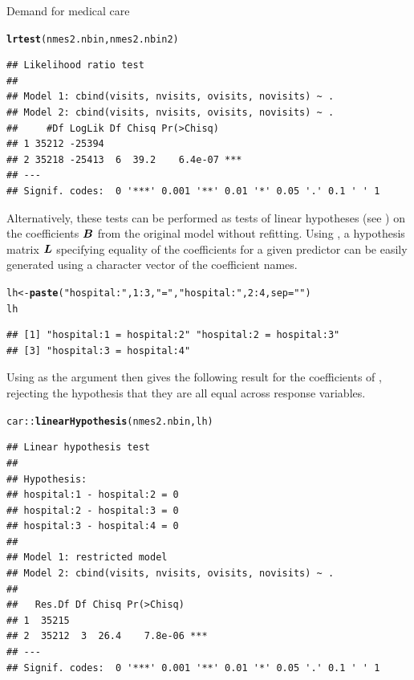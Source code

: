 \documentclass[11pt]{book}\usepackage[]{graphicx}\usepackage[]{color}
\makeatletter
\newcommand{\hlnum}[1]{\textcolor[rgb]{0.686,0.059,0.569}{#1}}%
\newcommand{\hlstr}[1]{\textcolor[rgb]{0.192,0.494,0.8}{#1}}%
\newcommand{\hlopt}[1]{\textcolor[rgb]{0,0,0}{#1}}%
\newcommand{\hlstd}[1]{\textcolor[rgb]{0.345,0.345,0.345}{#1}}%
\newcommand{\hlkwb}[1]{\textcolor[rgb]{0.69,0.353,0.396}{#1}}%
\newcommand{\hlkwc}[1]{\textcolor[rgb]{0.333,0.667,0.333}{#1}}%
\newcommand{\hlkwd}[1]{\textcolor[rgb]{0.737,0.353,0.396}{\textbf{#1}}}%
\newenvironment{kframe}{%
 \def\at@end@of@kframe{}%
 \ifinner\ifhmode%
  \def\at@end@of@kframe{\end{minipage}}%
  \begin{minipage}{\columnwidth}%
 \fi\fi%
 \def\FrameCommand##1{\hskip\@totalleftmargin \hskip-\fboxsep
 \colorbox{shadecolor}{##1}\hskip-\fboxsep
     \hskip-\linewidth \hskip-\@totalleftmargin \hskip\columnwidth}%
 \MakeFramed {\advance\hsize-\width
   \@totalleftmargin\z@ \linewidth\hsize
   \@setminipage}}%
 {\par\unskip\endMakeFramed%
 \at@end@of@kframe}
\newenvironment{knitrout}{}{} %
\renewenvironment{knitrout}{\small\renewcommand{\baselinestretch}{.85}}{} %
\makeatother
\begin{document}
\begin{Example}[nmes5]{Demand for medical care}
\begin{knitrout}
\begin{kframe}
\begin{alltt}
\hlkwd{lrtest}\hlstd{(nmes2.nbin, nmes2.nbin2)}
\end{alltt}
\begin{verbatim}
## Likelihood ratio test
## 
## Model 1: cbind(visits, nvisits, ovisits, novisits) ~ .
## Model 2: cbind(visits, nvisits, ovisits, novisits) ~ .
##     #Df LogLik Df Chisq Pr(>Chisq)    
## 1 35212 -25394                        
## 2 35218 -25413  6  39.2    6.4e-07 ***
## ---
## Signif. codes:  0 '***' 0.001 '**' 0.01 '*' 0.05 '.' 0.1 ' ' 1
\end{verbatim}
\end{kframe}
\end{knitrout}

Alternatively, these tests can be performed as tests of linear hypotheses (see )
on the coefficients
$\bm{B}$ from the original model without refitting. Using , a hypothesis
matrix $\bm{L}$ specifying equality of the coefficients for a given predictor can be
easily generated using a character vector of the coefficient names.

\begin{knitrout}
\color{fgcolor}\begin{kframe}
\begin{alltt}
\hlstd{lh} \hlkwb{<-} \hlkwd{paste}\hlstd{(}\hlstr{"hospital:"}\hlstd{,} \hlnum{1}\hlopt{:}\hlnum{3}\hlstd{,} \hlstr{" = "}\hlstd{,} \hlstr{"hospital:"}\hlstd{,} \hlnum{2}\hlopt{:}\hlnum{4}\hlstd{,} \hlkwc{sep}\hlstd{=}\hlstr{""}\hlstd{)}
\hlstd{lh}
\end{alltt}
\begin{verbatim}
## [1] "hospital:1 = hospital:2" "hospital:2 = hospital:3"
## [3] "hospital:3 = hospital:4"
\end{verbatim}
\end{kframe}
\end{knitrout}
Using  as the  argument then gives the following result
for the coefficients of , rejecting the hypothesis that they are all equal
across response variables.
\begin{knitrout}
\color{fgcolor}\begin{kframe}
\begin{alltt}
\hlstd{car::}\hlkwd{linearHypothesis}\hlstd{(nmes2.nbin, lh)}
\end{alltt}
\begin{verbatim}
## Linear hypothesis test
## 
## Hypothesis:
## hospital:1 - hospital:2 = 0
## hospital:2 - hospital:3 = 0
## hospital:3 - hospital:4 = 0
## 
## Model 1: restricted model
## Model 2: cbind(visits, nvisits, ovisits, novisits) ~ .
## 
##   Res.Df Df Chisq Pr(>Chisq)    
## 1  35215                        
## 2  35212  3  26.4    7.8e-06 ***
## ---
## Signif. codes:  0 '***' 0.001 '**' 0.01 '*' 0.05 '.' 0.1 ' ' 1
\end{verbatim}
\end{kframe}
\end{knitrout}
\end{Example}
\end{document}
